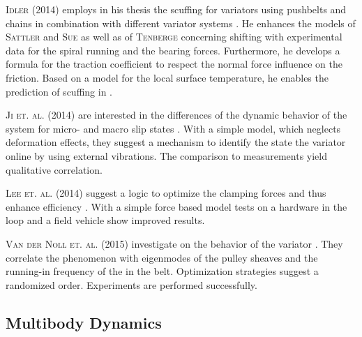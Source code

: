 \textsc{Idler} (2014) employs in his thesis the scuffing for \CVT variators using pushbelts and chains in combination with different variator systems \cite{idler_fresstragfahigkeit_2014}.
He enhances the models of \textsc{Sattler} and \textsc{Sue} as well as of \textsc{Tenberge} concerning shifting with experimental data for the spiral running and the bearing forces.
Furthermore, he develops a formula for the traction coefficient to respect the normal force influence on the friction.
Based on a model for the local surface temperature, he enables the prediction of scuffing in \CVTs.


\textsc{Ji et. al.} (2014) are interested in the differences of the dynamic behavior of the system for micro- and macro slip states \cite{ji_power_2014}.
With a simple model, which neglects deformation effects, they suggest a mechanism to identify the state the variator online by using external vibrations.
The comparison to measurements yield qualitative correlation.\par

\textsc{Lee et. al.} (2014) suggest a logic to optimize the clamping forces and thus enhance efficiency \cite{lee_study_2014}.
With a simple force based model tests on a hardware in the loop and a field vehicle show improved results.\par


\textsc{Van der Noll et. al.} (2015) investigate on the \NVH behavior of the variator \cite{van_der_noll_gerauschoptimierung_2015}. 
They correlate the \EIN phenomenon with eigenmodes of the pulley sheaves and the running-in frequency of the \els in the belt.
Optimization strategies suggest a randomized \el order.
Experiments are performed successfully.

\subsection{Multibody Dynamics} \label{subsec:MultibodyDynamics}

